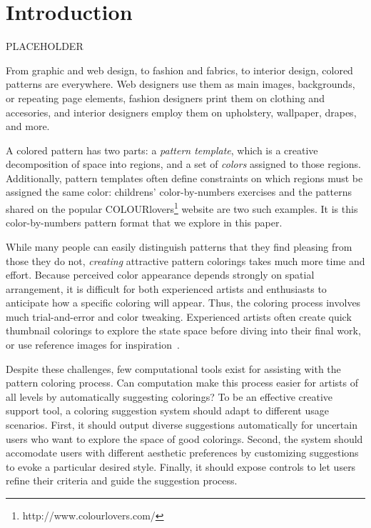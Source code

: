 \section{Introduction}
\label{sec:introduction}

PLACEHOLDER

From graphic and web design, to fashion and fabrics, to interior design, colored patterns are everywhere. Web designers use them as main images, backgrounds, or repeating page elements, fashion designers print them on clothing and accesories, and interior designers employ them on upholstery, wallpaper, drapes, and more.

A colored pattern has two parts: a \emph{pattern template}, which is a creative decomposition of space into regions, and a set of \emph{colors} assigned to those regions.
Additionally, pattern templates often define constraints on which regions must be assigned the same color: childrens' color-by-numbers exercises and the patterns shared on the popular COLOURlovers\footnote{http://www.colourlovers.com/} website are two such examples. It is this color-by-numbers pattern format that we explore in this paper.

While many people can easily distinguish patterns that they find pleasing from those they do not, \emph{creating} attractive pattern colorings takes much more time and effort. Because perceived color appearance depends strongly on spatial arrangement, it is difficult for both experienced artists and enthusiasts to anticipate how a specific coloring will appear. Thus, the coloring process involves much trial-and-error and color tweaking. Experienced artists often create quick thumbnail colorings to explore the state space before diving into their final work, or use reference images for inspiration~\cite{ColorPaletteTools}.

Despite these challenges, few computational tools exist for assisting with the pattern coloring process. Can computation make this process easier for artists of all levels by automatically suggesting colorings? To be an effective creative support tool, a coloring suggestion system should adapt to different usage scenarios. First, it should output diverse suggestions automatically for uncertain users who want to explore the space of good colorings. Second, the system should accomodate users with different aesthetic preferences by customizing suggestions to evoke a particular desired style. Finally, it should expose controls to let users refine their criteria and guide the suggestion process. 

